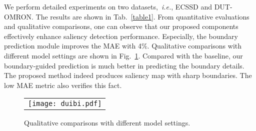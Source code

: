 \documentclass[journal]{IEEEtran}
\begin{document}
We perform detailed experiments on two datasets,~\emph{i.e.}, ECSSD and DUT-OMRON.
%
The results are shown in Tab.~\ref{table1}.
%
From quantitative evaluations and qualitative comparisons, one can observe that our proposed components effectively enhance saliency detection performance.
%
Especially, the boundary prediction module improves the MAE with 4\%.
%
Qualitative comparisons with different model settings are shown in Fig.~\ref{Fig_com}.
%
Compared with the baseline, our boundary-guided prediction is much better in predicting the boundary details.
%
The proposed method indeed produces saliency map with sharp boundaries. The low MAE metric also verifies this fact.
\begin{figure}[!t]
\begin{center}
\begin{tabular}{@{}c}
\texttt{[image: duibi.pdf]}
\end{tabular}
{\caption{Qualitative comparisons with different model settings.}
\label{Fig_com}}
\vspace{-6mm}
\end{center}
\end{figure}
\begin{table}[thp]
\vspace{-2mm}
\begin{center}
\caption{Quantitative comparison of different settings. The best results are in bold. The VGG-16\cite{simonyan2014very} version is AFFM$^{+}\bullet$.}
\label{table1}
\vspace{-5mm}
\end{center}
\end{table}
\end{document}
